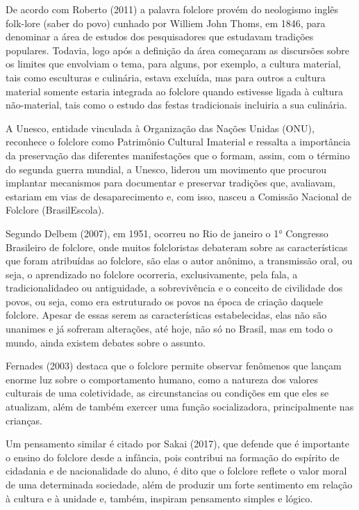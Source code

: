 \documentclass[12pt]{article}
\begin{document}
De acordo com Roberto (2011) a palavra folclore provém do neologismo inglês folk-lore (saber do povo) cunhado por Williem John Thoms, em 1846, para denominar a área de estudos dos pesquisadores que estudavam tradições populares. Todavia, logo após a definição da área começaram as discursões sobre os limites que envolviam o tema, para alguns, por exemplo, a cultura material, tais como esculturas e culinária, estava excluída, mas para outros a cultura material somente estaria integrada ao folclore quando estivesse ligada à cultura não-material,  tais como o estudo das festas tradicionais incluiria a sua culinária.

A Unesco, entidade vinculada à Organização das Nações Unidas (ONU), reconhece o folclore como Patrimônio Cultural Imaterial e ressalta a importância da preservação das diferentes manifestações que o formam, assim, com o término do segunda guerra mundial, a Unesco, liderou um movimento que procurou implantar mecanismos para documentar e preservar tradições que, avaliavam, estariam em vias de desaparecimento e, com isso, nasceu a Comissão Nacional de Folclore (BrasilEscola).

Segundo Delbem (2007), em 1951, ocorreu no Rio de janeiro o 1° Congresso Brasileiro de folclore, onde muitos folcloristas debateram sobre as características que foram atribuídas ao folclore, são elas o autor anônimo, a transmissão oral, ou seja, o aprendizado no folclore ocorreria, exclusivamente, pela fala, a tradicionalidadeo ou antiguidade, a sobrevivência e o conceito de civilidade dos povos, ou seja, como era estruturado os povos na época de criação daquele folclore. Apesar de essas serem as características estabelecidas, elas não são unanimes e já sofreram alterações, até hoje, não só no Brasil, mas em todo o mundo, ainda existem debates sobre o assunto.

Fernades (2003) destaca que o folclore permite observar fenômenos que lançam enorme luz sobre o comportamento humano, como a natureza dos valores culturais de uma coletividade, as circunstancias ou condições em que eles se atualizam, além de também exercer uma função socializadora, principalmente nas crianças.

Um pensamento similar é citado por Sakai (2017), que defende que é importante o ensino do folclore desde a infância, pois contribui na formação do espírito de cidadania e de nacionalidade do aluno, é dito que o folclore reflete o valor moral de uma determinada sociedade, além de produzir um forte sentimento em relação à cultura e à unidade e, também, inspiram pensamento simples e lógico.
\end{document}
